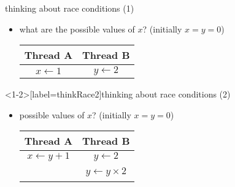 \begin{frame}{thinking about race conditions (1)}
\begin{itemize}
\item what are the possible values of $x$? (initially $x = y = 0$)  \\
\begin{tabular}{cc}
    \bfseries{Thread A} & \bfseries{Thread B} \\ \hline
    $x \leftarrow 1$ & $y \leftarrow 2$ \\
\end{tabular}
\iftoggle{heldback}{}{
\item<2-> must be 1. Thread B can't do anything
}
\end{itemize}
\end{frame}

\begin{frame}<1-2>[label=thinkRace2]{thinking about race conditions (2)}
\begin{itemize}
\item possible values of $x$? (initially $x = y = 0$) \\
\begin{tabular}{cc}
    \bfseries{Thread A} & \bfseries{Thread B} \\ \hline
    $x \leftarrow y + 1$ & $y \leftarrow 2$ \\
                    ~ & $y \leftarrow y \times 2$ \\
\end{tabular}
\iftoggle{heldback}{}{
\item<2-> if A goes first, then B: $1$
\item<2-> if B goes first, then A: $5$
\item<2-> if B line one, then A, then B line two: $3$
\item<3-> \ldots and why not 7:
    \begin{itemize}
    \item B (start): $y \leftarrow 2 = 0010_{\text{TWO}}$; then y bit 3 $\leftarrow$ 0; y bit 2 $\leftarrow$ 1; then
    \item A: x $\leftarrow 110_{\text{TWO}} + 1 = 7$; then
    \item B (finish): y bit 1 $\leftarrow$ 0; y bit 0 $\leftarrow$ 0
    \end{itemize}
}
\end{itemize}
\end{frame}

